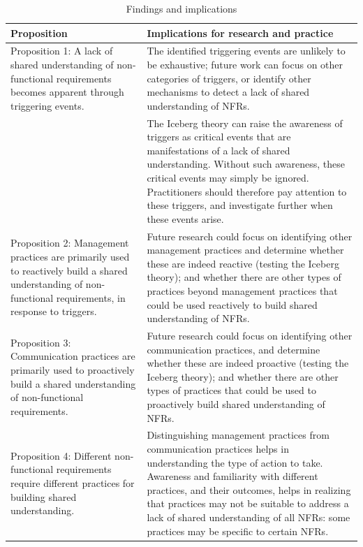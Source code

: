 \documentclass[smallextended]{svjour3}
\begin{document}
\begin{table}[!h]

\centering
\caption{Findings and implications}
\label{tab:implications}
\begin{tabular}{p{4cm}p{7.7cm}} %
    
\toprule 
Proposition  & Implications for research and practice \\
\midrule 

Proposition 1: A lack of shared understanding of non-functional requirements
becomes apparent through triggering events. 
& The identified triggering events are unlikely to be exhaustive; future work can focus on other categories of triggers, or identify other mechanisms to detect a lack of shared understanding of NFRs. 
\\

\addlinespace

& The Iceberg theory can raise the awareness of triggers as critical events that are manifestations of a lack of shared understanding. Without such awareness, these critical events may simply be ignored. Practitioners should therefore pay attention to these triggers, and investigate further when these events arise. \\

\addlinespace 

Proposition 2: Management practices are primarily used to reactively build a
shared understanding of non-functional requirements, in response to triggers.
& 
Future research could focus on identifying other management practices and determine whether these are indeed reactive (testing the Iceberg theory); and whether there are other types of practices beyond management practices that could be used reactively to build shared understanding of NFRs.
\\

\addlinespace 

Proposition 3: Communication practices are primarily used to proactively
build a shared understanding of non-functional requirements.
& Future research could focus on identifying other communication practices, and determine whether these are indeed proactive (testing the Iceberg theory); and whether there are other types of practices that could be used to proactively build shared understanding of NFRs.
\\

\addlinespace 

Proposition 4: Different non-functional requirements require different practices for building shared understanding.
&
Distinguishing management practices from communication practices helps in understanding the type of action to take. 
Awareness and familiarity with different practices, and their outcomes, helps in realizing that practices may not be suitable to address a lack of shared understanding of all NFRs: some practices may be specific to certain NFRs.\\


\end{tabular}
\end{table}
\end{document}
